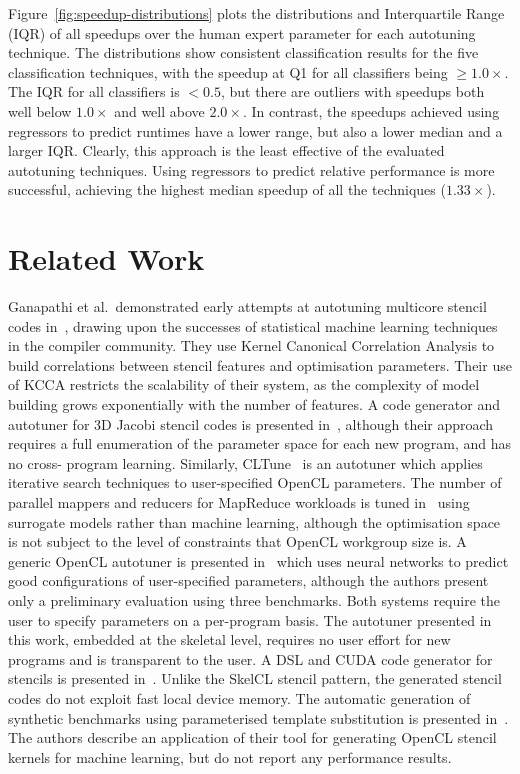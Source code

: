 \documentclass[preprint,nonatbib,10pt,nocopyrightspace]{sigplanconf}
\begin{document}
  Figure~\ref{fig:speedup-distributions} plots the distributions and Interquartile
  Range (IQR) of all speedups over the human expert parameter for each autotuning
  technique. The distributions show consistent classification results for the five
  classification techniques, with the speedup at Q1 for all classifiers being $\ge
  1.0\times$. The IQR for all classifiers is $< 0.5$, but there are outliers with
  speedups both well below $1.0\times$ and well above $2.0\times$. In contrast,
  the speedups achieved using regressors to predict runtimes have a lower range,
  but also a lower median and a larger IQR. Clearly, this approach is the least
  effective of the evaluated autotuning techniques. Using regressors to predict
  relative performance is more successful, achieving the highest median speedup of
  all the techniques ($1.33\times$).


  \section{Related Work}\label{sec:related}

  Ganapathi et al.\ demonstrated early attempts at autotuning multicore stencil
  codes in~\cite{Ganapathi2009}, drawing upon the successes of statistical machine
  learning techniques in the compiler community. They use Kernel Canonical
  Correlation Analysis to build correlations between stencil features and
  optimisation parameters. Their use of KCCA restricts the scalability of their
  system, as the complexity of model building grows exponentially with the number
  of features. A code generator and autotuner for 3D Jacobi stencil codes is
  presented in~\cite{Zhang2013a}, although their approach requires a full
  enumeration of the parameter space for each new program, and has no cross-
  program learning. Similarly, CLTune~\cite{Nugteren2015} is an autotuner which
  applies iterative search techniques to user-specified OpenCL parameters. The
  number of parallel mappers and reducers for MapReduce workloads is tuned
  in~\cite{Johnston2015a} using surrogate models rather than machine learning,
  although the optimisation space is not subject to the level of constraints that
  OpenCL workgroup size is. A generic OpenCL autotuner is presented
  in~\cite{Falch2015} which uses neural networks to predict good configurations of
  user-specified parameters, although the authors present only a preliminary
  evaluation using three benchmarks. Both systems require the user to specify
  parameters on a per-program basis. The autotuner presented in this work,
  embedded at the skeletal level, requires no user effort for new programs and is
  transparent to the user. A DSL and CUDA code generator for stencils is presented
  in~\cite{Kamil2010}. Unlike the SkelCL stencil pattern, the generated stencil
  codes do not exploit fast local device memory. The automatic generation of
  synthetic benchmarks using parameterised template substitution is presented
  in~\cite{Chiu2015}. The authors describe an application of their tool for
  generating OpenCL stencil kernels for machine learning, but do not report any
  performance results.
\end{document}
